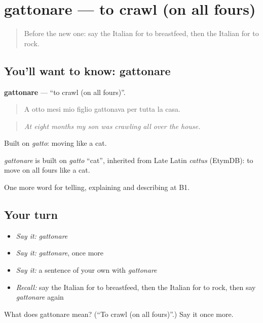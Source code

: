 \section[gattonare]{gattonare — to crawl (on all fours)}

\label{lesson:IT-C496-gattonare}



\begin{quote}
Before the new one: say the Italian for to breastfeed, then the Italian for to rock.
\end{quote}

\subsection*{You'll want to know: gattonare}
\textbf{gattonare} — \textquotedblleft{}to crawl (on all fours)\textquotedblright{}.

\begin{quote}
A otto mesi mio figlio gattonava per tutta la casa.
\end{quote}

\begin{quote}
\emph{At eight months my son was crawling all over the house.}
\end{quote}

Built on \emph{gatto}: moving like a cat.

\begin{cousinweb}
\emph{gattonare} is built on \emph{gatto} \textquotedblleft{}cat\textquotedblright{}, inherited from Late Latin \emph{cattus} (EtymDB): to move on all fours like a cat.
\end{cousinweb}

\begin{grammarlens}[title={What you've built}]
One more word for telling, explaining and describing at B1.
\end{grammarlens}

\subsection*{Your turn}
\begin{itemize}
\raggedright
  \item \emph{Say it:} \emph{gattonare}
  \item \emph{Say it:} \emph{gattonare}, once more
  \item \emph{Say it:} a sentence of your own with \emph{gattonare}
  \item \emph{Recall:} say the Italian for to breastfeed, then the Italian for to rock, then say \emph{gattonare} again
\end{itemize}

\begin{tcolorbox}[breakable,colback=teal!4,colframe=teal!35!black,title={Before you move on}]
What does gattonare mean? (\textquotedblleft{}To crawl (on all fours)\textquotedblright{}.) Say it once more.
\end{tcolorbox}
